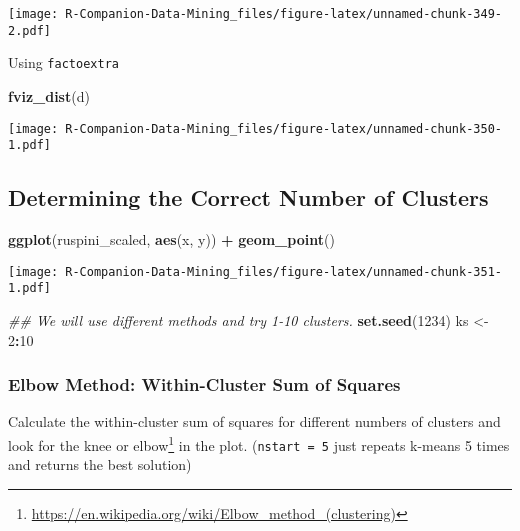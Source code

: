 \documentclass[
  notitlepage]{book}
\newenvironment{Shaded}{\begin{snugshade}}{\end{snugshade}}
\newcommand{\CommentTok}[1]{\textcolor[rgb]{0.56,0.35,0.01}{\textit{#1}}}
\newcommand{\DecValTok}[1]{\textcolor[rgb]{0.00,0.00,0.81}{#1}}
\newcommand{\KeywordTok}[1]{\textcolor[rgb]{0.13,0.29,0.53}{\textbf{#1}}}
\newcommand{\NormalTok}[1]{#1}
\newcommand{\OperatorTok}[1]{\textcolor[rgb]{0.81,0.36,0.00}{\textbf{#1}}}
\newcommand{\StringTok}[1]{\textcolor[rgb]{0.31,0.60,0.02}{#1}}
\DeclareRobustCommand{\href}[2]{#2\footnote{\url{#1}}}
\begin{document}
\texttt{[image: R-Companion-Data-Mining\_files/figure-latex/unnamed-chunk-349-2.pdf]}

Using \texttt{factoextra}

\begin{Shaded}
\begin{Highlighting}[]
\KeywordTok{fviz\_dist}\NormalTok{(d)}
\end{Highlighting}
\end{Shaded}

\texttt{[image: R-Companion-Data-Mining\_files/figure-latex/unnamed-chunk-350-1.pdf]}

\hypertarget{determining-the-correct-number-of-clusters}{%
\subsection{Determining the Correct Number of Clusters}\label{determining-the-correct-number-of-clusters}}

\begin{Shaded}
\begin{Highlighting}[]
\KeywordTok{ggplot}\NormalTok{(ruspini\_scaled, }\KeywordTok{aes}\NormalTok{(x, y)) }\OperatorTok{+}\StringTok{ }\KeywordTok{geom\_point}\NormalTok{()}
\end{Highlighting}
\end{Shaded}

\texttt{[image: R-Companion-Data-Mining\_files/figure-latex/unnamed-chunk-351-1.pdf]}

\begin{Shaded}
\begin{Highlighting}[]
\CommentTok{\#\# We will use different methods and try 1{-}10 clusters.}
\KeywordTok{set.seed}\NormalTok{(}\DecValTok{1234}\NormalTok{)}
\NormalTok{ks \textless{}{-}}\StringTok{ }\DecValTok{2}\OperatorTok{:}\DecValTok{10}
\end{Highlighting}
\end{Shaded}

\hypertarget{elbow-method-within-cluster-sum-of-squares}{%
\subsubsection{Elbow Method: Within-Cluster Sum of Squares}\label{elbow-method-within-cluster-sum-of-squares}}

Calculate the within-cluster sum of squares for different numbers of
clusters and look for the \href{https://en.wikipedia.org/wiki/Elbow_method_(clustering)}{knee or
elbow} in the
plot. (\texttt{nstart\ =\ 5} just repeats k-means 5 times and returns the best
solution)
\end{document}
